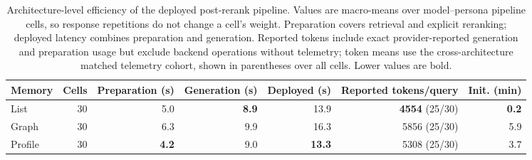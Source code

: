 \begin{table}[t]
\centering
\small
\begin{tabular}{lrrrrrr}
\toprule
Memory & Cells & Preparation (s) & Generation (s) & Deployed (s) & Reported tokens/query & Init. (min) \\
\midrule
List & 30 & 5.0 & \textbf{8.9} & 13.9 & \textbf{4554} (25/30) & \textbf{0.2} \\
Graph & 30 & 6.3 & 9.9 & 16.3 & 5856 (25/30) & 5.9 \\
Profile & 30 & \textbf{4.2} & 9.0 & \textbf{13.3} & 5308 (25/30) & 3.7 \\
\bottomrule
\end{tabular}
\caption{Architecture-level efficiency of the deployed post-rerank pipeline. Values are macro-means over model--persona pipeline cells, so response repetitions do not change a cell's weight. Preparation covers retrieval and explicit reranking; deployed latency combines preparation and generation. Reported tokens include exact provider-reported generation and preparation usage but exclude backend operations without telemetry; token means use the cross-architecture matched telemetry cohort, shown in parentheses over all cells. Lower values are bold.}
\label{tab:cimemories-architecture-efficiency}
\end{table}
